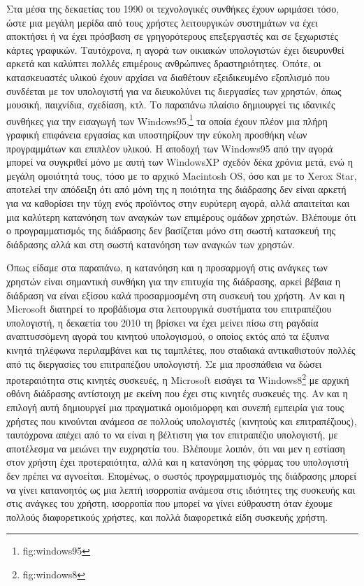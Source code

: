 \documentclass[
]{article}
\begin{document}
Στα μέσα της δεκαετίας του 1990 οι τεχνολογικές συνθήκες έχουν ωριμάσει
τόσο, ώστε μια μεγάλη μερίδα από τους χρήστες λειτουργικών συστημάτων να
έχει αποκτήσει ή να έχει πρόσβαση σε γρηγορότερους επεξεργαστές και σε
ξεχωριστές κάρτες γραφικών. Ταυτόχρονα, η αγορά των οικιακών υπολογιστών
έχει διευρυνθεί αρκετά και καλύπτει πολλές επιμέρους ανθρώπινες
δραστηριότητες. Οπότε, οι κατασκευαστές υλικού έχουν αρχίσει να
διαθέτουν εξειδικευμένο εξοπλισμό που συνδέεται με τον υπολογιστή για να
διευκολύνει τις διεργασίες των χρηστών, όπως μουσική, παιχνίδια,
σχεδίαση, κτλ. Το παραπάνω πλαίσιο δημιουργεί τις ιδανικές συνθήκες για
την εισαγωγή των Windows95,\footnote{fig:windows95} τα οποία έχουν πλέον
μια πλήρη γραφική επιφάνεια εργασίας και υποστηρίζουν την εύκολη
προσθήκη νέων προγραμμάτων και επιπλέον υλικού. Η αποδοχή των Windows95
από την αγορά μπορεί να συγκριθεί μόνο με αυτή των WindowsXP σχεδόν δέκα
χρόνια μετά, ενώ η μεγάλη ομοιότητά τους, τόσο με το αρχικό Macintosh
OS, όσο και με το Xerox Star, αποτελεί την απόδειξη ότι από μόνη της η
ποιότητα της διάδρασης δεν είναι αρκετή για να καθορίσει την τύχη ενός
προϊόντος στην ευρύτερη αγορά, αλλά απαιτείται και μια καλύτερη
κατανόηση των αναγκών των επιμέρους ομάδων χρηστών. Βλέπουμε ότι ο
προγραμματισμός της διάδρασης δεν βασίζεται μόνο στη σωστή κατασκευή της
διάδρασης αλλά και στη σωστή κατανόηση των αναγκών των χρηστών.

Όπως είδαμε στα παραπάνω, η κατανόηση και η προσαρμογή στις ανάγκες των
χρηστών είναι σημαντική συνθήκη για την επιτυχία της διάδρασης, αρκεί
βέβαια η διάδραση να είναι εξίσου καλά προσαρμοσμένη στη συσκευή του
χρήστη. Αν και η Microsoft διατηρεί το προβάδισμα στα λειτουργικά
συστήματα του επιτραπέζιου υπολογιστή, η δεκαετία του 2010 τη βρίσκει να
έχει μείνει πίσω στη ραγδαία αναπτυσσόμενη αγορά του κινητού
υπολογισμού, ο οποίος εκτός από τα έξυπνα κινητά τηλέφωνα περιλαμβάνει
και τις ταμπλέτες, που σταδιακά αντικαθιστούν πολλές από τις διεργασίες
του επιτραπέζιου υπολογιστή. Σε μια προσπάθεια να δώσει προτεραιότητα
στις κινητές συσκευές, η Microsoft εισάγει τα Windows8\footnote{fig:windows8}
με αρχική οθόνη διάδρασης αντίστοιχη με εκείνη που έχει στις κινητές
συσκευές της. Αν και η επιλογή αυτή δημιουργεί μια πραγματικά ομοιόμορφη
και συνεπή εμπειρία για τους χρήστες που κινούνται ανάμεσα σε πολλούς
υπολογιστές (κινητούς και επιτραπέζιους), ταυτόχρονα απέχει από το να
είναι η βέλτιστη για τον επιτραπέζιο υπολογιστή, με αποτέλεσμα να
μειώνει την ευχρηστία του. Βλέπουμε λοιπόν, ότι ναι μεν η εστίαση στον
χρήστη έχει προτεραιότητα, αλλά και η κατανόηση της φόρμας του
υπολογιστή δεν πρέπει να αγνοείται. Επομένως, ο σωστός προγραμματισμός
της διάδρασης μπορεί να γίνει κατανοητός ως μια λεπτή ισορροπία ανάμεσα
στις ιδιότητες της συσκευής και στις ανάγκες του χρήστη, ισορροπία που
μπορεί να γίνει εύθραυστη όταν έχουμε πολλούς διαφορετικούς χρήστες, και
πολλά διαφορετικά είδη συσκευής χρήστη.
\end{document}
